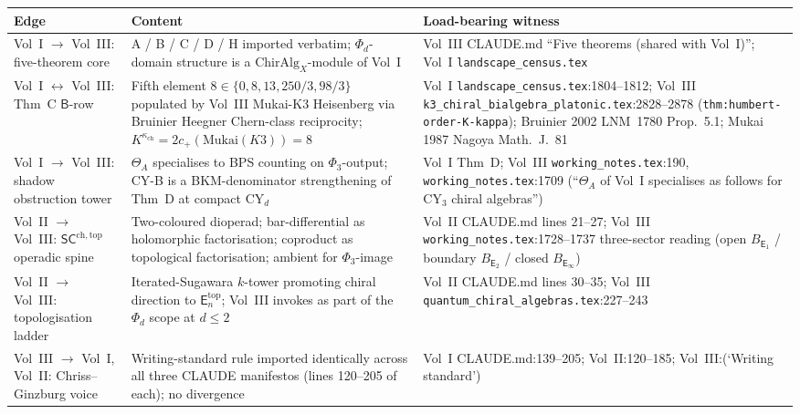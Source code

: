 \documentclass[11pt]{article}
\theoremstyle{definition}
\theoremstyle{remark}
\providecommand{\ChirAlg}{\mathrm{ChirAlg}}
\providecommand{\Eone}{\mathsf{E}_1}
\providecommand{\Etwo}{\mathsf{E}_2}
\providecommand{\En}{\mathsf{E}_n}
\providecommand{\Einf}{\mathsf{E}_\infty}
\providecommand{\kch}{\kappa_{\mathrm{ch}}}
\begin{document}
\renewcommand{\arraystretch}{1.15}
\begin{longtable}{@{}p{4.5cm}p{5.5cm}p{4.5cm}@{}}
\toprule
\textbf{Edge} & \textbf{Content} & \textbf{Load-bearing witness} \\
\midrule
\endfirsthead

Vol~I $\to$ Vol~III: five-theorem core
& A / B / C / D / H imported verbatim; $\Phi_d$-domain structure is a
$\ChirAlg_X$-module of Vol~I
& Vol~III CLAUDE.md ``Five theorems (shared with Vol~I)''; Vol~I
\texttt{landscape\_census.tex}
\\[0.3ex]

Vol~I $\leftrightarrow$ Vol~III: Thm~C $\mathsf{B}$-row
& Fifth element $8\in\{0,8,13,250/3,98/3\}$ populated by Vol~III
Mukai-K3 Heisenberg via Bruinier Heegner Chern-class reciprocity;
$K^{\kch} = 2c_+(\mathrm{Mukai}(K3)) = 8$
& Vol~I \texttt{landscape\_census.tex}:1804--1812; Vol~III
\texttt{k3\_chiral\_bialgebra\_platonic.tex}:2828--2878
(\texttt{thm:humbert-order-K-kappa}); Bruinier 2002 LNM~1780
Prop.~5.1; Mukai 1987 Nagoya Math.~J.~81
\\[0.3ex]

Vol~I $\to$ Vol~III: shadow obstruction tower
& $\Theta_A$ specialises to BPS counting on $\Phi_3$-output; CY-B is a
BKM-denominator strengthening of Thm~D at compact CY$_d$
& Vol~I Thm~D; Vol~III \texttt{working\_notes.tex}:190,
\texttt{working\_notes.tex}:1709 (``$\Theta_A$ of Vol~I specialises
as follows for CY$_3$ chiral algebras'')
\\[0.3ex]

Vol~II $\to$ Vol~III: $\mathsf{SC}^{\mathrm{ch,top}}$ operadic spine
& Two-coloured dioperad; bar-differential as holomorphic
factorisation; coproduct as topological factorisation; ambient
for $\Phi_3$-image
& Vol~II CLAUDE.md lines 21--27; Vol~III
\texttt{working\_notes.tex}:1728--1737 three-sector reading (open
$B_{\Eone}$ / boundary $B_{\Etwo}$ / closed $B_{\Einf}$)
\\[0.3ex]

Vol~II $\to$ Vol~III: topologisation ladder
& Iterated-Sugawara $k$-tower promoting chiral direction to
$\En^{\mathrm{top}}$; Vol~III invokes as part of the $\Phi_d$ scope
at $d\leq 2$
& Vol~II CLAUDE.md lines 30--35; Vol~III
\texttt{quantum\_chiral\_algebras.tex}:227--243
\\[0.3ex]

Vol~III $\to$ Vol~I, Vol~II: Chriss--Ginzburg voice
& Writing-standard rule imported identically across all three
CLAUDE manifestos (lines 120--205 of each); no divergence
& Vol~I CLAUDE.md:139--205; Vol~II:120--185; Vol~III:(`Writing
standard')
\\[0.3ex]


\end{longtable}
\end{document}
